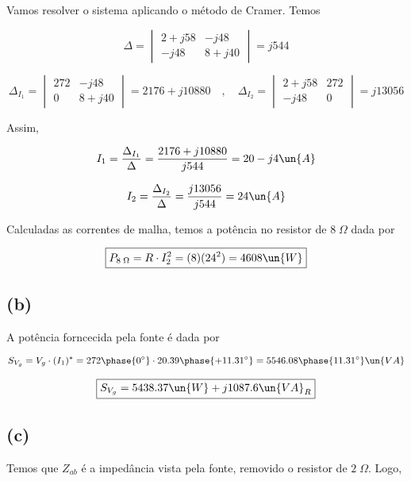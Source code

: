 \endgroup

Vamos resolver o sistema aplicando o método de Cramer. Temos

\begingroup
\renewcommand*{\arraystretch}{1.5}

\[ 
    \Delta
    =
    \begin{vmatrix}
        2 + j58 & -j48    \\
        -j48    & 8 + j40
    \end{vmatrix}
    =
    j544
\]

\[
    \Delta_{I_1}
    =
    \begin{vmatrix}
        272 & -j48    \\
        0    & 8 + j40
    \end{vmatrix}
    =
    2176 + j10880  \quad , \quad 
    \Delta_{I_2}
    =
    \begin{vmatrix}
        2 + j58 & 272    \\
        -j48    & 0
    \end{vmatrix}
    =
    j13056
\]

\endgroup

Assim, 

\[ I_1 = \frac{\Delta_{I_1}}{\Delta} = \frac{2176 + j10880}{j544} = 20 - j4 \un{A} \]

\[ I_2 = \frac{\Delta_{I_2}}{\Delta} = \frac{j13056}{j544} = 24 \un{A} \]

Calculadas as correntes de malha, temos a potência no resistor de $8 \;\Omega$ dada por

\[ \boxed{P_{8 \;\Omega} = R \cdot I_2^2 = (8)(24^2) = 4608 \un{W}}  \]

\subsection*{(b)}

A potência forncecida pela fonte é dada por

\[ S_{V_g} = V_g \cdot (I_1)^* = 272\phase{0^{\circ}} \cdot 20.39\phase{+11.31^{\circ}} = 5546.08\phase{11.31^{\circ}} \un{VA} \]

\[ \boxed{S_{V_g} = 5438.37 \un{W} + j1087.6 \un{VA}_R} \]

\subsection*{(c)}

Temos que $Z_{ab}$ é a impedância vista pela fonte, removido o resistor de $2 \;\Omega$. Logo,

